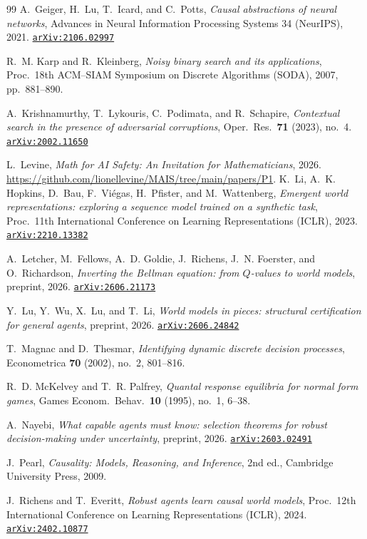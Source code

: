 \documentclass[11pt]{amsart}
\newcommand{\arxiv}[1]{\href{https://arxiv.org/abs/#1}{\texttt{arXiv:#1}}}
\theoremstyle{plain}
\theoremstyle{definition}
\begin{document}
\begin{thebibliography}{99}
A.~Geiger, H.~Lu, T.~Icard, and C.~Potts,
\emph{Causal abstractions of neural networks},
Advances in Neural Information Processing Systems 34 (NeurIPS), 2021. \arxiv{2106.02997}

R.~M. Karp and R.~Kleinberg,
\emph{Noisy binary search and its applications},
Proc.\ 18th ACM--SIAM Symposium on Discrete Algorithms (SODA), 2007, pp.~881--890.

A.~Krishnamurthy, T.~Lykouris, C.~Podimata, and R.~Schapire,
\emph{Contextual search in the presence of adversarial corruptions},
Oper.\ Res.\ \textbf{71} (2023), no.~4. \arxiv{2002.11650}

L.~Levine,
\emph{Math for AI Safety: An Invitation for Mathematicians},
2026. \url{https://github.com/lionellevine/MAIS/tree/main/papers/P1}.
K.~Li, A.~K. Hopkins, D.~Bau, F.~Vi\'egas, H.~Pfister, and M.~Wattenberg,
\emph{Emergent world representations: exploring a sequence model trained on a synthetic task},
Proc.\ 11th International Conference on Learning Representations (ICLR), 2023. \arxiv{2210.13382}

A.~Letcher, M.~Fellows, A.~D. Goldie, J.~Richens, J.~N. Foerster, and O.~Richardson,
\emph{Inverting the Bellman equation: from $Q$-values to world models},
preprint, 2026. \arxiv{2606.21173}

Y.~Lu, Y.~Wu, X.~Lu, and T.~Li,
\emph{World models in pieces: structural certification for general agents},
preprint, 2026. \arxiv{2606.24842}

T.~Magnac and D.~Thesmar,
\emph{Identifying dynamic discrete decision processes},
Econometrica \textbf{70} (2002), no.~2, 801--816.

R.~D. McKelvey and T.~R. Palfrey,
\emph{Quantal response equilibria for normal form games},
Games Econom.\ Behav.\ \textbf{10} (1995), no.~1, 6--38.

A.~Nayebi,
\emph{What capable agents must know: selection theorems for robust decision-making under uncertainty},
preprint, 2026. \arxiv{2603.02491}

J.~Pearl,
\emph{Causality: Models, Reasoning, and Inference},
2nd ed., Cambridge University Press, 2009.

J.~Richens and T.~Everitt,
\emph{Robust agents learn causal world models},
Proc.\ 12th International Conference on Learning Representations (ICLR), 2024. \arxiv{2402.10877}


\end{thebibliography}
\end{document}
